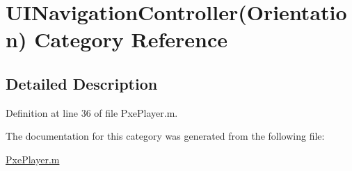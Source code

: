 \hypertarget{category_u_i_navigation_controller_07_orientation_08}{\section{U\-I\-Navigation\-Controller(Orientation) Category Reference}
\label{category_u_i_navigation_controller_07_orientation_08}
}


\subsection{Detailed Description}


Definition at line 36 of file Pxe\-Player.\-m.



The documentation for this category was generated from the following file\-:\begin{DoxyCompactItemize}
\item 
\hyperlink{_pxe_player_8m}{Pxe\-Player.\-m}\end{DoxyCompactItemize}
